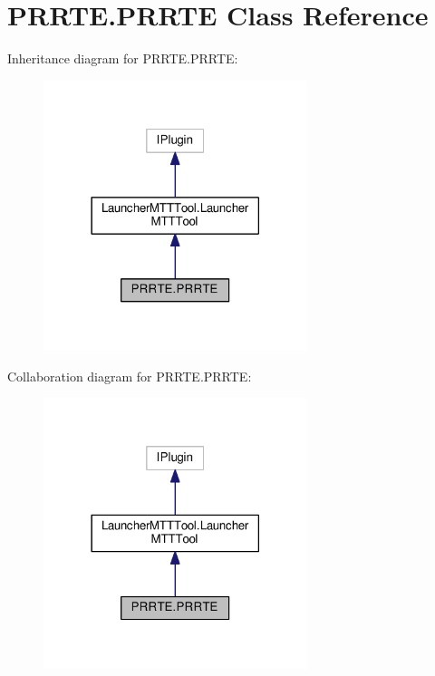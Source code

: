 \hypertarget{class_p_r_r_t_e_1_1_p_r_r_t_e}{\section{P\-R\-R\-T\-E.\-P\-R\-R\-T\-E Class Reference}
\label{class_p_r_r_t_e_1_1_p_r_r_t_e}
}


Inheritance diagram for P\-R\-R\-T\-E.\-P\-R\-R\-T\-E\-:
\nopagebreak
\begin{figure}[H]
\begin{center}
\leavevmode
\includegraphics[width=218pt]{class_p_r_r_t_e_1_1_p_r_r_t_e__inherit__graph}
\end{center}
\end{figure}


Collaboration diagram for P\-R\-R\-T\-E.\-P\-R\-R\-T\-E\-:
\nopagebreak
\begin{figure}[H]
\begin{center}
\leavevmode
\includegraphics[width=218pt]{class_p_r_r_t_e_1_1_p_r_r_t_e__coll__graph}
\end{center}
\end{figure}
